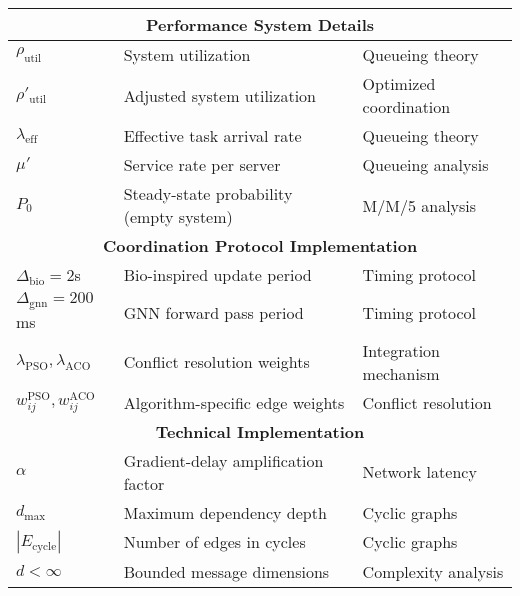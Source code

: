 \documentclass{article}
\begin{document}
\begin{longtable}{|p{2.5cm}|p{6cm}|p{3.5cm}|}
\multicolumn{3}{|c|}{\textbf{Performance System Details}} \\
\hline
$\rho_{\text{util}}$ & System utilization & Queueing theory \\
$\rho'_{\text{util}}$ & Adjusted system utilization & Optimized coordination \\
$\lambda_{\text{eff}}$ & Effective task arrival rate & Queueing theory \\
$\mu'$ & Service rate per server & Queueing analysis \\
$P_0$ & Steady-state probability (empty system) & M/M/5 analysis \\
\hline

\multicolumn{3}{|c|}{\textbf{Coordination Protocol Implementation}} \\
\hline
$\Delta_{\text{bio}} = 2$s & Bio-inspired update period & Timing protocol \\
$\Delta_{\text{gnn}} = 200$ms & GNN forward pass period & Timing protocol \\
$\lambda_{\text{PSO}}, \lambda_{\text{ACO}}$ & Conflict resolution weights & Integration mechanism \\
$w_{ij}^{\text{PSO}}, w_{ij}^{\text{ACO}}$ & Algorithm-specific edge weights & Conflict resolution \\
\hline

\multicolumn{3}{|c|}{\textbf{Technical Implementation}} \\
\hline
$\alpha$ & Gradient-delay amplification factor & Network latency \\
$d_{\max}$ & Maximum dependency depth & Cyclic graphs \\
$|E_{\text{cycle}}|$ & Number of edges in cycles & Cyclic graphs \\
$d < \infty$ & Bounded message dimensions & Complexity analysis \\
\hline
\end{longtable}
\end{document}
